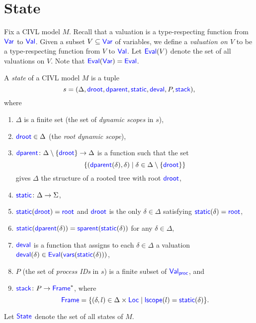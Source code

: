 \section{State}
\label{sec:state}

Fix a CIVL model $M$.  Recall that a valuation is a type-respecting
function from $\Var$ to $\Val$.  Given a subset $V\subseteq\Var$ of
variables, we define a \emph{valuation on $V$} to be a type-respecting
function from $V$ to $\Val$.  Let $\Eval(V)$ denote the set of all
valuations on $V$.  Note that $\Eval(\Var)=\Eval$.

\begin{definition}
  \label{def:state}
  A \emph{state} of a CIVL model $M$ is a tuple 
  \[
  s=(\Delta, \droot, \dparent, \static, \deval, P, \stack),
  \]
  where
  \begin{enumerate}
  \item $\Delta$ is a finite set (the set of \emph{dynamic scopes} in
    $s$),
  \item $\droot\in\Delta$ (the \emph{root dynamic scope}),
  \item $\dparent\colon \Delta\setminus\{\droot\}\ra\Delta$
    is a function such that the set 
    \[
    \{(\dparent(\delta),\delta)\mid \delta\in
    \Delta\setminus\{\droot\}\}
    \]
    gives $\Delta$ the structure of a rooted tree with root $\droot$,
    \item $\static\colon\Delta\ra\Sigma$,
  \item $\static(\droot)=\rootscope$ and $\droot$ is the only
    $\delta\in\Delta$ satisfying $\static(\delta)=\rootscope$,
  \item $\static(\dparent(\delta))=\sparent(\static(\delta))$ for any
    $\delta\in\Delta$,
  \item $\deval$ is a function that assigns to each $\delta\in\Delta$
    a valuation $\deval(\delta)\in\Eval(\vars(\static(\delta)))$,
  \item $P$ (the set of \emph{process IDs} in $s$) 
    is a finite subset of $\Val_{\proc}$, and
  \item $\stack\colon P\ra \Frame^*$, where
    \[
    \Frame=\{(\delta,l)\in\Delta\times\Loc\mid\lscope(l)=\static(\delta)\}.
    \]
  \end{enumerate}
  Let $\State$ denote the set of all states of $M$.
\end{definition}



